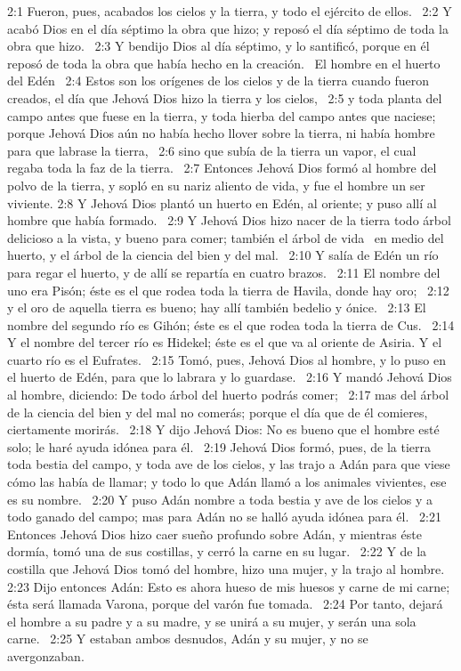 2:1 Fueron, pues, acabados los cielos y la tierra, y todo el ejército de ellos.  
2:2 Y acabó Dios en el día séptimo la obra que hizo; y reposó el día séptimo de toda la obra que hizo.  
2:3 Y bendijo Dios al día séptimo, y lo santificó, porque en él reposó de toda la obra que había hecho en la creación.  
El hombre en el huerto del Edén  
2:4 Estos son los orígenes de los cielos y de la tierra cuando fueron creados, el día que Jehová Dios hizo la tierra y los cielos,  
2:5 y toda planta del campo antes que fuese en la tierra, y toda hierba del campo antes que naciese; porque Jehová Dios aún no había hecho llover sobre la tierra, ni había hombre para que labrase la tierra,  
2:6 sino que subía de la tierra un vapor, el cual regaba toda la faz de la tierra.  
2:7 Entonces Jehová Dios formó al hombre del polvo de la tierra, y sopló en su nariz aliento de vida, y fue el hombre un ser viviente. 
2:8 Y Jehová Dios plantó un huerto en Edén, al oriente; y puso allí al hombre que había formado.  
2:9 Y Jehová Dios hizo nacer de la tierra todo árbol delicioso a la vista, y bueno para comer; también el árbol de vida  en medio del huerto, y el árbol de la ciencia del bien y del mal.  
2:10 Y salía de Edén un río para regar el huerto, y de allí se repartía en cuatro brazos.  
2:11 El nombre del uno era Pisón; éste es el que rodea toda la tierra de Havila, donde hay oro;  
2:12 y el oro de aquella tierra es bueno; hay allí también bedelio y ónice.  
2:13 El nombre del segundo río es Gihón; éste es el que rodea toda la tierra de Cus.  
2:14 Y el nombre del tercer río es Hidekel; éste es el que va al oriente de Asiria. Y el cuarto río es el Eufrates.  
2:15 Tomó, pues, Jehová Dios al hombre, y lo puso en el huerto de Edén, para que lo labrara y lo guardase.  
2:16 Y mandó Jehová Dios al hombre, diciendo: De todo árbol del huerto podrás comer;  
2:17 mas del árbol de la ciencia del bien y del mal no comerás; porque el día que de él comieres, ciertamente morirás.  
2:18 Y dijo Jehová Dios: No es bueno que el hombre esté solo; le haré ayuda idónea para él.  
2:19 Jehová Dios formó, pues, de la tierra toda bestia del campo, y toda ave de los cielos, y las trajo a Adán para que viese cómo las había de llamar; y todo lo que Adán llamó a los animales vivientes, ese es su nombre.  
2:20 Y puso Adán nombre a toda bestia y ave de los cielos y a todo ganado del campo; mas para Adán no se halló ayuda idónea para él.  
2:21 Entonces Jehová Dios hizo caer sueño profundo sobre Adán, y mientras éste dormía, tomó una de sus costillas, y cerró la carne en su lugar.  
2:22 Y de la costilla que Jehová Dios tomó del hombre, hizo una mujer, y la trajo al hombre.  
2:23 Dijo entonces Adán: Esto es ahora hueso de mis huesos y carne de mi carne; ésta será llamada Varona, porque del varón fue tomada.  
2:24 Por tanto, dejará el hombre a su padre y a su madre, y se unirá a su mujer, y serán una sola carne.  
2:25 Y estaban ambos desnudos, Adán y su mujer, y no se avergonzaban.  

